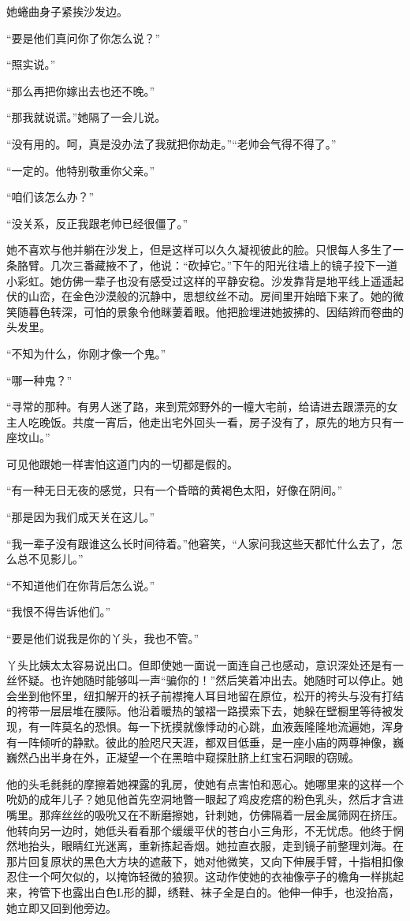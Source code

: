 \par 她蜷曲身子紧挨沙发边。
\par “要是他们真问你了你怎么说？”
\par “照实说。”
\par “那么再把你嫁出去也还不晚。”
\par “那我就说谎。”她隔了一会儿说。
\par “没有用的。呵，真是没办法了我就把你劫走。”“老帅会气得不得了。”
\par “一定的。他特别敬重你父亲。”
\par “咱们该怎么办？”
\par “没关系，反正我跟老帅已经很僵了。”
\par 她不喜欢与他并躺在沙发上，但是这样可以久久凝视彼此的脸。只恨每人多生了一条胳臂。几次三番藏掖不了，他说：“砍掉它。”下午的阳光往墙上的镜子投下一道小彩虹。她仿佛一辈子也没有感受过这样的平静安稳。沙发靠背是地平线上遥遥起伏的山峦，在金色沙漠般的沉静中，思想纹丝不动。房间里开始暗下来了。她的微笑随暮色转深，可怕的景象令他眯萋着眼。他把脸埋进她披拂的、因结辫而卷曲的头发里。
\par “不知为什么，你刚才像一个鬼。”
\par “哪一种鬼？”
\par “寻常的那种。有男人迷了路，来到荒郊野外的一幢大宅前，给请进去跟漂亮的女主人吃晚饭。共度一宵后，他走出宅外回头一看，房子没有了，原先的地方只有一座坟山。”
\par 可见他跟她一样害怕这道门内的一切都是假的。
\par “有一种无日无夜的感觉，只有一个昏暗的黄褐色太阳，好像在阴间。”
\par “那是因为我们成天关在这儿。”
\par “我一辈子没有跟谁这么长时间待着。”他窘笑，“人家问我这些天都忙什么去了，怎么总不见影儿。”
\par “不知道他们在你背后怎么说。”
\par “我恨不得告诉他们。”
\par “要是他们说我是你的丫头，我也不管。”
\par 丫头比姨太太容易说出口。但即使她一面说一面连自己也感动，意识深处还是有一丝怀疑。也许她随时能够叫一声“骗你的！”然后笑着冲出去。她随时可以停止。她会坐到他怀里，纽扣解开的袄子前襟掩人耳目地留在原位，松开的袴头与没有打结的袴带一层层堆在腰际。他沿着暖热的皱褶一路摸索下去，她躲在壁橱里等待被发现，有一阵莫名的恐惧。每一下抚摸就像悸动的心跳，血液轰隆隆地流遍她，浑身有一阵倾听的静默。彼此的脸咫尺天涯，都双目低垂，是一座小庙的两尊神像，巍巍然凸出半身在外，正凝望一个在黑暗中窥探肚脐上红宝石洞眼的窃贼。
\par 他的头毛毵毵的摩擦着她裸露的乳房，使她有点害怕和恶心。她哪里来的这样一个吮奶的成年儿子？她见他首先空洞地瞥一眼起了鸡皮疙瘩的粉色乳头，然后才含进嘴里。那痒丝丝的吸吮又在不断磨擦她，针刺她，仿佛隔着一层金属筛网在挤压。他转向另一边时，她低头看看那个缓缓平伏的苍白小三角形，不无忧虑。他终于惘然地抬头，眼睛红光迷离，重新拣起香烟。她拉直衣服，走到镜子前整理刘海。在那片回复原状的黑色大方块的遮蔽下，她对他微笑，又向下伸展手臂，十指相扣像忍住一个呵欠似的，以掩饰轻微的狼狈。这动作使她的衣袖像亭子的檐角一样挑起来，袴管下也露出白色L形的脚，绣鞋、袜子全是白的。他伸一伸手，也没抬高，她立即又回到他旁边。
